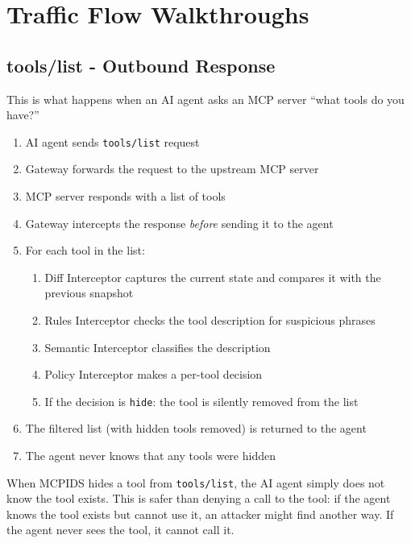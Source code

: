 \documentclass[12pt,a4paper]{report}
\begin{document}
\chapter{Traffic Flow Walkthroughs}

\section{tools/list - Outbound Response}

This is what happens when an AI agent asks an MCP server ``what tools do you have?''

\begin{enumerate}
  \item AI agent sends \texttt{tools/list} request
  \item Gateway forwards the request to the upstream MCP server
  \item MCP server responds with a list of tools
  \item Gateway intercepts the response \textit{before} sending it to the agent
  \item For each tool in the list:
    \begin{enumerate}
      \item Diff Interceptor captures the current state and compares it with the previous snapshot
      \item Rules Interceptor checks the tool description for suspicious phrases
      \item Semantic Interceptor classifies the description
      \item Policy Interceptor makes a per-tool decision
      \item If the decision is \texttt{hide}: the tool is silently removed from the list
    \end{enumerate}
  \item The filtered list (with hidden tools removed) is returned to the agent
  \item The agent never knows that any tools were hidden
\end{enumerate}

\begin{infobox}
When MCPIDS hides a tool from \texttt{tools/list}, the AI agent simply does
not know the tool exists. This is safer than denying a call to the tool:
if the agent knows the tool exists but cannot use it, an attacker might
find another way. If the agent never sees the tool, it cannot call it.
\end{infobox}
\end{document}
